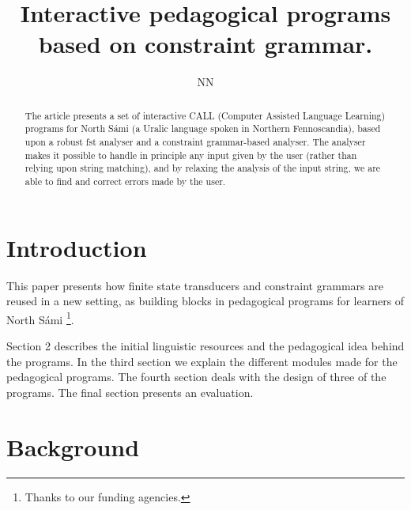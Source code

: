 \documentclass[11pt]{article}
\title{Interactive pedagogical programs based on constraint grammar.}
\author{NN}
\begin{document}


\maketitle
{}
 
\maketitle

\begin{abstract}
The article presents a set of interactive CALL (Computer Assisted Language Learning) programs for North Sámi (a Uralic language spoken in Northern Fennoscandia), based upon a robust fst analyser and a constraint grammar-based analyser. The analyser makes it possible to handle in principle any input given by the user (rather than relying upon string matching), and by relaxing the analysis of the input string, we are able to find and correct errors made by the user. 
\end{abstract}

\section{Introduction}
This paper presents how finite state transducers and constraint grammars are reused in a new setting, as building blocks in pedagogical programs for learners of North Sámi \footnote{Thanks to our funding agencies.}. %

Section 2 describes the initial linguistic resources and the pedagogical idea behind the programs. In the third section we explain the different modules made for the pedagogical programs. The fourth section deals with the design of three of the programs. The final section presents an evaluation.



\section{Background}
\end{document}
